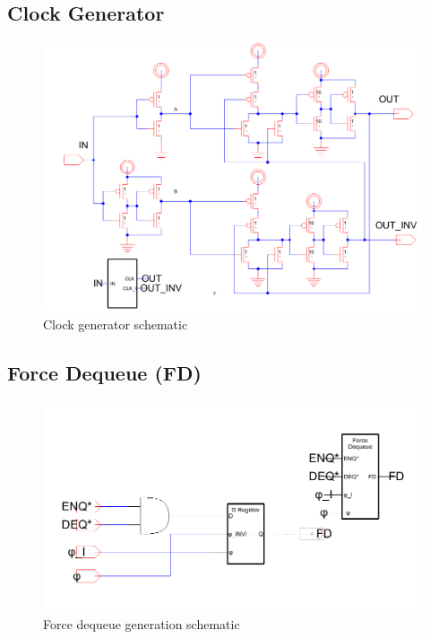 \documentclass[12pt]{report}
\begin{document}
\subsection*{Clock Generator}
\begin{figure}[H]
  \centering
    \includegraphics[width=1.0\textwidth]{Schematics/clk_gen_schematic.PNG}
  \caption{Clock generator schematic}
  \label{fig:clk_gen_schematic}
\end{figure}

\subsection*{Force Dequeue (FD)}
\begin{figure}[H]
  \centering
    \includegraphics[width=1.0\textwidth]{Schematics/force_dequeue_schematic.PNG}
  \caption{Force dequeue generation schematic}
  \label{fig:force_dequeue_schematic}
\end{figure}
\end{document}

